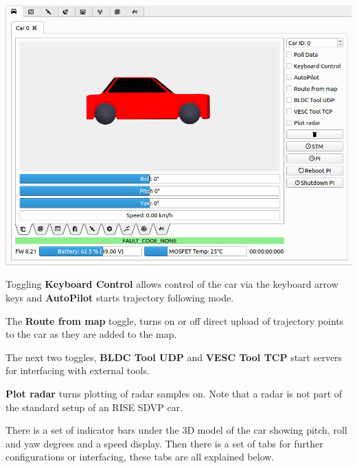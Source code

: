 \documentclass[12pt]{article} %
\begin{document}
  
\noindent \begin{minipage}{0.5\textwidth}
    \noindent \includegraphics[width=\textwidth]{./screens/Car_orientation.png}
\end{minipage}
\begin{minipage}{0.5\textwidth} %

   Toggling {\bf Keyboard Control}
  allows control of the car via the keyboard arrow keys and {\bf
    AutoPilot} starts trajectory following mode.

  The {\bf Route from map} toggle, turns on or off direct upload of
  trajectory points to the car as they are added to the map.

  The next two toggles, {\bf BLDC Tool UDP} and {\bf VESC Tool TCP}
  start servers for interfacing with external tools. 

  {\bf Plot radar} turns plotting of radar samples on. Note that a
  radar is not part of the standard setup of an RISE SDVP car.
\end{minipage}

There is a set of indicator bars under the 3D model of the car showing
pitch, roll and yaw degrees and a speed display. Then there is a set
of tabs for further configurations or interfacing, these tabs are all
explained below.


\end{document}
